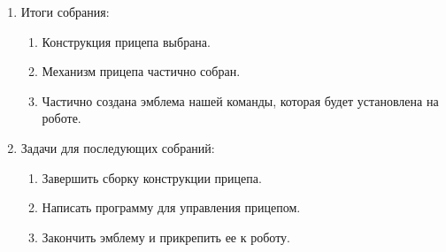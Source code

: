 \begin{enumerate}
\begin{enumerate}
	\end{enumerate}
	
	\item Итоги собрания: 
	\begin{enumerate}
		\item Конструкция прицепа выбрана.
		
		\item Механизм прицепа частично собран.
		
		\item Частично создана эмблема нашей команды, которая будет установлена на роботе.
		
	\end{enumerate}
	
	\item Задачи для последующих собраний:
	\begin{enumerate}
		\item Завершить сборку конструкции прицепа.
		
		\item Написать программу для управления прицепом.
		
		\item Закончить эмблему и прикрепить ее к роботу.
		
	\end{enumerate}     
\end{enumerate}
\fillpage

